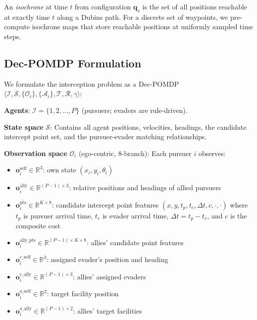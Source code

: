 \documentclass[10pt,conference]{IEEEtran}
\begin{document}
An \emph{isochrone} at time $t$ from configuration $\mathbf{q}_s$ is the set of all positions reachable at exactly time $t$ along a Dubins path. For a discrete set of waypoints, we pre-compute isochrone maps that store reachable positions at uniformly sampled time steps.

\subsection{Dec-POMDP Formulation}

We formulate the interception problem as a Dec-POMDP $\langle \mathcal{I}, \mathcal{S}, \{\mathcal{O}_i\}, \{\mathcal{A}_i\}, \mathcal{T}, \mathcal{R}, \gamma \rangle$:

\textbf{Agents}: $\mathcal{I} = \{1, 2, \ldots, P\}$ (pursuers; evaders are rule-driven).

\textbf{State space} $\mathcal{S}$: Contains all agent positions, velocities, headings, the candidate intercept point set, and the pursuer-evader matching relationships.

\textbf{Observation space} $\mathcal{O}_i$ (ego-centric, 8-branch): Each pursuer $i$ observes:
\begin{itemize}
    \item $\mathbf{o}_i^{\text{self}} \in \mathbb{R}^3$: own state $(x_i, y_i, \theta_i)$
    \item $\mathbf{o}_i^{\text{ally}} \in \mathbb{R}^{(P-1) \times 3}$: relative positions and headings of allied pursuers
    \item $\mathbf{o}_i^{\text{pts}} \in \mathbb{R}^{K \times 8}$: candidate intercept point features $(x, y, t_p, t_e, \Delta t, c, \cdot, \cdot)$ where $t_p$ is pursuer arrival time, $t_e$ is evader arrival time, $\Delta t = t_p - t_e$, and $c$ is the composite cost
    \item $\mathbf{o}_i^{\text{ally\_pts}} \in \mathbb{R}^{(P-1) \times K \times 8}$: allies' candidate point features
    \item $\mathbf{o}_i^{e\_\text{self}} \in \mathbb{R}^3$: assigned evader's position and heading
    \item $\mathbf{o}_i^{e\_\text{ally}} \in \mathbb{R}^{(P-1) \times 3}$: allies' assigned evaders
    \item $\mathbf{o}_i^{a\_\text{self}} \in \mathbb{R}^2$: target facility position
    \item $\mathbf{o}_i^{a\_\text{ally}} \in \mathbb{R}^{(P-1) \times 2}$: allies' target facilities
\end{itemize}
\end{document}
